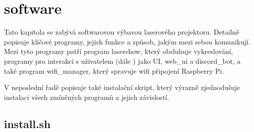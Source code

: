 \chapter{software}

Tato kapitola se zabývá softwarovou výbavou laserového projektoru. Detailně popisuje klíčové programy, jejich funkce a způsob, jakým mezi sebou komunikují.
Mezi tyto programy patří program lasershow, který obsluhuje vykreslování, programy pro interakci s uživatelem (dále ) jako UI, web\_ui a discord\_bot, a také program wifi\_manager, který spravuje wifi připojení Raspberry Pi.

V neposlední řadě popisuje také instalační skript, který výrazně zjednodušuje instalaci všech zmíněných programů a jejich závislostí.










\section{install.sh}

